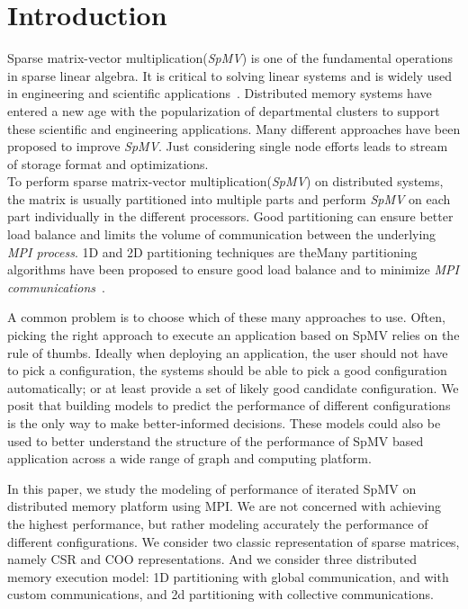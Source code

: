 \documentclass[sigconf,review,anonymous]{acmart}
\begin{document}
\section{Introduction}
Sparse matrix-vector multiplication(\textit{SpMV}) is one of the
fundamental operations in sparse linear algebra. It is critical to
solving linear systems and is widely used in engineering and
scientific applications~\cite{gleich2015pagerank, saad2003iterative,
  dytrych2016efficacy}.  Distributed memory systems have entered a new
age with the popularization of departmental clusters to support these
scientific and engineering applications.  Many different approaches
have been proposed to improve \textit{SpMV}. Just considering single
node efforts leads to stream of storage format and optimizations. 
\\
To perform sparse matrix-vector multiplication(\textit{SpMV}) on
distributed systems, the matrix is usually partitioned into multiple
parts and perform \textit{SpMV} on each part individually in the
different processors. Good partitioning can ensure better load balance
and limits the volume of communication between the underlying
\textit{MPI process}. 1D and 2D partitioning techniques are theMany partitioning algorithms have been proposed
to ensure good load balance and to minimize \textit{MPI communications}~\cite{deveci2015hypergraph, karypis1995multilevel,kaya2013analysis}.

A common problem is to choose which of these many approaches to use.
Often, picking the right approach to execute an application based on
SpMV relies on the rule of thumbs. Ideally when deploying an
application, the user should not have to pick a configuration, the
systems should be able to pick a good configuration automatically; or
at least provide a set of likely good candidate configuration. We
posit that building models to predict the performance of different
configurations is the only way to make better-informed
decisions. These models could also be used to better understand the
structure of the performance of SpMV based application across a wide
range of graph and computing platform.

In this paper, we study the modeling of performance of iterated SpMV
on distributed memory platform using MPI. We are not concerned with
achieving the highest performance, but rather modeling accurately the
performance of different configurations. We consider two classic
representation of sparse matrices, namely CSR and COO
representations. And we consider three distributed memory execution
model: 1D partitioning with global communication, and with custom
communications, and 2d partitioning with collective communications.
\end{document}
